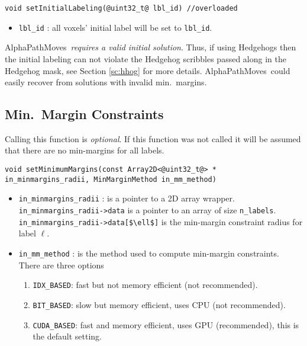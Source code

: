 \documentclass[12pt,letterpaper]{article}
\def\APM{{\ttfamily AlphaPathMoves}~}
\begin{document}
\begin{lstlisting}
void setInitialLabeling(@uint32_t@ lbl_id) //overloaded
\end{lstlisting}
\vspace{-2ex}
\begin{itemize}
\item \lstinline{lbl_id} : all voxels' initial label will be set to \lstinline{lbl_id}.
\end{itemize}

\begin{tcolorbox}
\APM {\em requires a valid initial solution}. Thus, if using Hedgehogs then the initial labeling can not violate the Hedgehog scribbles passed along in the Hedgehog mask, see Section \ref{sc:hhog} for more details. \APM could easily recover from solutions with invalid min.~margins.
\end{tcolorbox}

\subsection{Min.~Margin Constraints}
Calling this function is {\em optional}. If this function was not called it will be assumed that there are no min-margins for all labels.
\begin{lstlisting}
void setMinimumMargins(const Array2D<@uint32_t@> * in_minmargins_radii, MinMarginMethod in_mm_method)
\end{lstlisting}
\vspace{-2ex}
\begin{itemize}
\item \lstinline{in_minmargins_radii} : is a pointer to a 2D array wrapper. \lstinline{in_minmargins_radii->data}  is a pointer to an array of size \lstinline[mathescape=true]{n_labels}.
    \lstinline[mathescape=true]{in_minmargins_radii->data[$\ell$]} is the min-margin constraint radius for label $\ell$.
\item \lstinline{in_mm_method} : is the method used to compute min-margin constraints.
There are three options
\begin{enumerate}
\item \lstinline{IDX_BASED}: fast but not memory efficient (not recommended).
\item \lstinline{BIT_BASED}: slow but memory efficient, uses CPU (not recommended).
\item \lstinline{CUDA_BASED}: fast and memory efficient, uses GPU (recommended), this is the default setting.
\end{enumerate}
\end{itemize}
\end{document}
